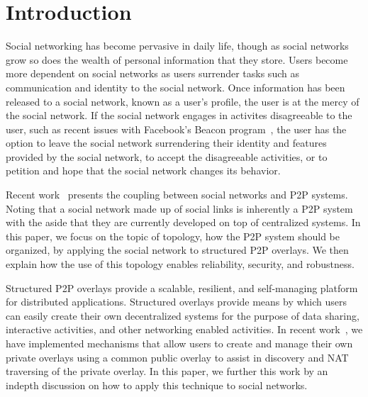 \documentclass[letterpaper,twocolumn,10pt]{article}
\begin{document}
\section{Introduction}
Social networking has become pervasive in daily life, though as social networks
grow so does the wealth of personal information that they store.  Users become
more dependent on social networks as users surrender tasks such as communication
and identity to the social network.  Once information has been released to a
social network, known as a user's profile, the user is at the mercy of the
social network.  If the social network engages in activites disagreeable to the
user, such as recent issues with Facebook's Beacon program~\cite{facebook_beacon},
the user has the option to leave the social network surrendering their identity
and features provided by the social network, to accept the disagreeable
activities, or to petition and hope that the social network changes its behavior.

Recent work~\cite{p2p_socialnetwork} presents the coupling between social
networks and P2P systems.  Noting that a social network made up of social
links is inherently a P2P system with the aside that they are currently
developed on top of centralized systems.  In this paper, we focus on the
topic of topology, how the P2P system should be organized, by applying the
social network to structured P2P overlays.  We then explain how the use of
this topology enables reliability, security, and robustness.

Structured P2P overlays provide a scalable, resilient, and self-managing
platform for distributed applications.  Structured overlays provide means
by which users can easily create their own decentralized systems for the
purpose of data sharing, interactive activities, and other networking enabled
activities.  In recent work~\cite{icdcs10}, we have implemented mechanisms that
allow users to create and manage their own private overlays using a common
public overlay to assist in discovery and NAT traversing of the private overlay.
In this paper, we further this work by an indepth discussion on how to apply
this technique to social networks.
\end{document}
